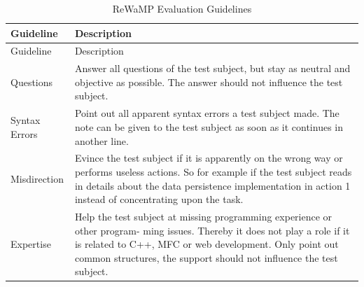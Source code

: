 \hypertarget{tbl:rewamp.guidelines}{}
\begin{longtable}[]{@{}ll@{}}
\caption{\label{tbl:rewamp.guidelines}ReWaMP Evaluation Guidelines}\tabularnewline
\toprule
\begin{minipage}[b]{0.17\columnwidth}\raggedright
Guideline\strut
\end{minipage} & \begin{minipage}[b]{0.77\columnwidth}\raggedright
Description\strut
\end{minipage}\tabularnewline
\midrule
\endfirsthead
\toprule
\begin{minipage}[b]{0.17\columnwidth}\raggedright
Guideline\strut
\end{minipage} & \begin{minipage}[b]{0.77\columnwidth}\raggedright
Description\strut
\end{minipage}\tabularnewline
\midrule
\endhead
\begin{minipage}[t]{0.17\columnwidth}\raggedright
Questions\strut
\end{minipage} & \begin{minipage}[t]{0.77\columnwidth}\raggedright
Answer all questions of the test subject, but stay as neutral and objective as possible.
The answer should not influence the test subject.\strut
\end{minipage}\tabularnewline
\begin{minipage}[t]{0.17\columnwidth}\raggedright
Syntax Errors\strut
\end{minipage} & \begin{minipage}[t]{0.77\columnwidth}\raggedright
Point out all apparent syntax errors a test subject made.
The note can be given to the test subject as soon as it continues in another line.\strut
\end{minipage}\tabularnewline
\begin{minipage}[t]{0.17\columnwidth}\raggedright
Misdirection\strut
\end{minipage} & \begin{minipage}[t]{0.77\columnwidth}\raggedright
Evince the test subject if it is apparently on the wrong way or performs useless actions.
So for example if the test subject reads in details about the data persistence implementation in action 1 instead of concentrating upon the task.\strut
\end{minipage}\tabularnewline
\begin{minipage}[t]{0.17\columnwidth}\raggedright
Expertise\strut
\end{minipage} & \begin{minipage}[t]{0.77\columnwidth}\raggedright
Help the test subject at missing programming experience or other program- ming issues.
Thereby it does not play a role if it is related to C++, MFC or web development.
Only point out common structures, the support should not influence the test subject.\strut
\end{minipage}\tabularnewline
\bottomrule
\end{longtable}

